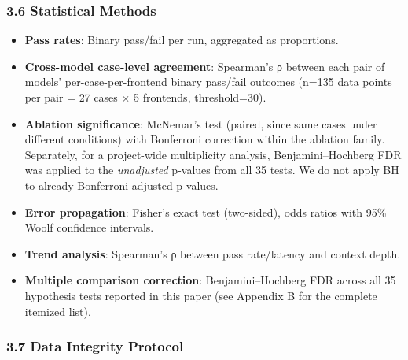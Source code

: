 \subsubsection{3.6 Statistical Methods}\label{statistical-methods}



\begin{itemize}

\tightlist

\item

  \textbf{Pass rates}: Binary pass/fail per run, aggregated as proportions.

\item

  \textbf{Cross-model case-level agreement}: Spearman's ρ between each pair of models' per-case-per-frontend binary pass/fail outcomes (n=135 data points per pair = 27 cases × 5 frontends, threshold=30).

\item

  \textbf{Ablation significance}: McNemar's test (paired, since same cases under different conditions) with Bonferroni correction within the ablation family. Separately, for a project-wide multiplicity analysis, Benjamini--Hochberg FDR was applied to the \emph{unadjusted} p-values from all 35 tests. We do not apply BH to already-Bonferroni-adjusted p-values.

\item

  \textbf{Error propagation}: Fisher's exact test (two-sided), odds ratios with 95\% Woolf confidence intervals.

\item

  \textbf{Trend analysis}: Spearman's ρ between pass rate/latency and context depth.

\item

  \textbf{Multiple comparison correction}: Benjamini--Hochberg FDR across all 35 hypothesis tests reported in this paper (see Appendix B for the complete itemized list).

\end{itemize}



\subsubsection{3.7 Data Integrity Protocol}\label{data-integrity-protocol}



